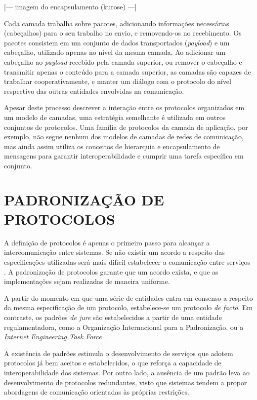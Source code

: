 [--- imagem do encapsulamento (kurose) ---]

Cada camada trabalha sobre pacotes, adicionando informações necessárias (cabeçalhos)
para o seu trabalho no envio, e removendo-os no recebimento. Os pacotes consistem em
um conjunto de dados transportados (\textit{payload}) e um cabeçalho, utilizado
apenas no nível da mesma camada. Ao adicionar um cabeçalho ao \textit{payload}
recebido pela camada superior, ou remover o cabeçalho e transmitir apenas o conteúdo
para a camada superior, as camadas são capazes de trabalhar cooperativamente, e
manter um diálogo com o protocolo do nível respectivo das outras entidades
envolvidas na comunicação.

Apesar deste processo descrever a interação entre os protocolos organizados em um
modelo de camadas, uma estratégia semelhante é utilizada em outros conjuntos de
protocolos. Uma família de protocolos da camada de aplicação, por exemplo, não
segue nenhum dos modelos de camadas de redes de comunicação, mas ainda assim utiliza
os conceitos de hierarquia e encapsulamento de mensagens para garantir
interoperabilidade e cumprir uma tarefa específica em conjunto.

\section{PADRONIZAÇÃO DE PROTOCOLOS}

A definição de protocolos é apenas o primeiro passo para alcançar a intercomunicação
entre sistemas. Se não existir um acordo a respeito das especificações utilizadas
será mais difícil estabelecer a comunicação entre serviços \cite{kurose2012}. A
padronização de protocolos garante que um acordo exista, e que as implementações
sejam realizadas de maneira uniforme.

A partir do momento em que uma série de entidades entra em consenso a respeito da
mesma especificação de um protocolo, estabelece-se um protocolo \textit{de facto}.
Em contraste, os padrões \textit{de jure} são estabelecidos a partir de uma entidade
regulamentadora, como a Organização Internacional para a Padronização, ou a
\textit{Internet Engineering Task Force} \cite{tanenbaum2010}.


A existência de padrões estimula o desenvolvimento de serviços que adotem protocolos
já bem aceitos e estabelecidos, o que reforça a capacidade de interoperabilidade dos
sistemas. Por outro lado, a ausência de um padrão leva ao desenvolvimento de
protocolos redundantes, visto que sistemas tendem a propor abordagens de comunicação
orientadas às próprias restrições.
 


